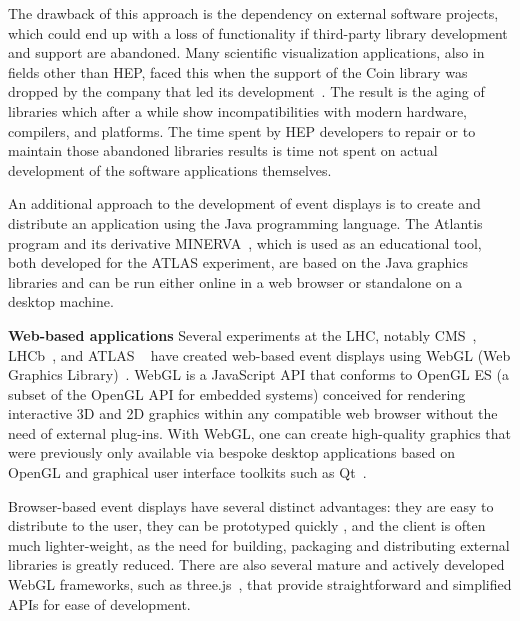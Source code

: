 \documentclass[12pt,a4paper]{article}
\begin{document}
The drawback of this approach is the dependency on external software projects, which could end up with a loss of functionality if
third-party library development and support are abandoned. Many scientific visualization applications, also in fields other than
HEP, faced this when the support of the Coin library was dropped by the company that led its development~\cite{CoinEndOfLifeLetter}.
The result is the aging of libraries which after a while show incompatibilities with modern hardware, compilers, and platforms. The time
spent by HEP developers to repair or to maintain those abandoned libraries results is time not spent on actual development
of the software applications themselves.

An additional approach to the development of event displays is to create and distribute an application using the Java programming language. The Atlantis~\cite{ATLASAtlantis}
program and its derivative MINERVA~\cite{ATLASMinerva}, which is used as an educational tool, both developed for the ATLAS experiment, are based on the Java graphics libraries and can be run either online in a web browser or standalone on a desktop machine.


{\bf Web-based applications} Several experiments at the LHC, notably CMS~\cite{CMSISpyWebGL}, LHCb~\cite{LHCbOnline2014}, and ATLAS
~\cite{ATLASTada2016, ATLASTracer2015} have created web-based event displays using WebGL (Web Graphics Library)~\cite{WebGL2011}.
WebGL is a JavaScript API that conforms to OpenGL ES (a subset of the OpenGL API for embedded systems) conceived for
rendering interactive 3D and 2D graphics within any compatible web browser without the need of external plug-ins. With WebGL,
one can create high-quality graphics that were previously only available via bespoke desktop applications based on OpenGL and
graphical user interface toolkits such as Qt~\cite{QtFramework}.

Browser-based event displays have several distinct advantages: they are easy to distribute to the user, they can be prototyped quickly
, and the client is often much lighter-weight, as the need for building, packaging and distributing external libraries is greatly reduced.
There are also several mature and actively developed WebGL frameworks, such as three.js~\cite{ThreeJS}, that provide straightforward
and simplified APIs for ease of development.
\end{document}
